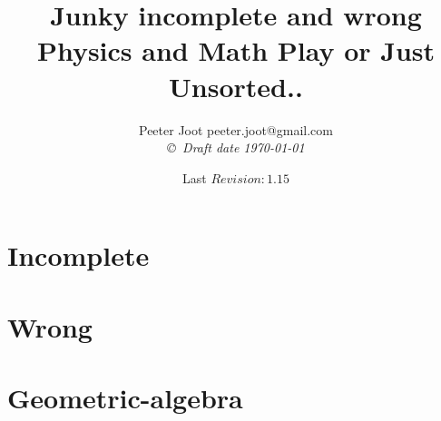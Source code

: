 \documentclass[12pt,leqno]{book}
\date{ Last $Revision: 1.15 $ }
\begin{document}

\title{Junky incomplete and wrong Physics and Math Play or Just Unsorted..}
\author{Peeter Joot  \quad peeter.joot@gmail.com \\
{\small\em \copyright \  Draft date \today }}

\maketitle

\clearpage{}
\tableofcontents

\clearpage{}

\pagestyle{plain}




\part{Incomplete}
















%
%
%
%
%

\part{Wrong}

%


\part{Geometric-algebra}






\end{document}
